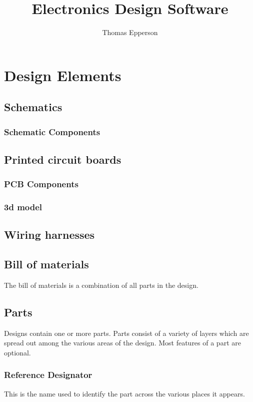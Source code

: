 \documentclass[letterpaper,12pt,twoside]{book}
\begin{document}
\title{Electronics Design Software}
\author{Thomas Epperson}
\maketitle
\newpage
\tableofcontents
\newpage

\chapter {Design Elements}
\section {Schematics}
\subsection {Schematic Components}
\section {Printed circuit boards}
\subsection {PCB Components}
\subsection {3d model}
\section {Wiring harnesses}
\section {Bill of materials}
The bill of materials is a combination of all parts in the design.

\section {Parts}
Designs contain one or more parts. Parts consist of a variety of layers which are spread out among the various areas of the design. Most features of a part are optional.

\subsection {Reference Designator}
This is the name used to identify the part across the various places it appears.
\end{document}
